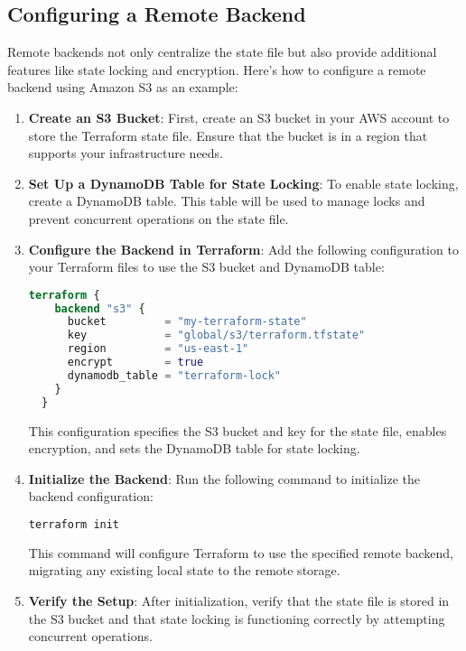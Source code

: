 \subsection{Configuring a Remote Backend}

Remote backends not only centralize the state file but also provide additional features like state locking and encryption. Here's how to configure a remote backend using Amazon S3 as an example:

\begin{enumerate}
  \item \textbf{Create an S3 Bucket}: First, create an S3 bucket in your AWS account to store the Terraform state file. Ensure that the bucket is in a region that supports your infrastructure needs.

  \item \textbf{Set Up a DynamoDB Table for State Locking}: To enable state locking, create a DynamoDB table. This table will be used to manage locks and prevent concurrent operations on the state file.

  \item \textbf{Configure the Backend in Terraform}: Add the following configuration to your Terraform files to use the S3 bucket and DynamoDB table:

  \begin{lstlisting}[language=terraform]
  terraform {
    backend "s3" {
      bucket         = "my-terraform-state"
      key            = "global/s3/terraform.tfstate"
      region         = "us-east-1"
      encrypt        = true
      dynamodb_table = "terraform-lock"
    }
  }
  \end{lstlisting}

  This configuration specifies the S3 bucket and key for the state file, enables encryption, and sets the DynamoDB table for state locking.

  \item \textbf{Initialize the Backend}: Run the following command to initialize the backend configuration:

  \begin{lstlisting}[language=bash]
  terraform init
  \end{lstlisting}

  This command will configure Terraform to use the specified remote backend, migrating any existing local state to the remote storage.

  \item \textbf{Verify the Setup}: After initialization, verify that the state file is stored in the S3 bucket and that state locking is functioning correctly by attempting concurrent operations.
\end{enumerate}

